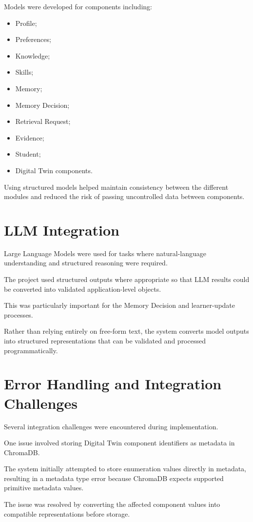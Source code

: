 \documentclass[12pt,a4paper]{article}
\begin{document}
Models were developed for components including:
\begin{itemize}[noitemsep,topsep=2pt]
    \item Profile;
    \item Preferences;
    \item Knowledge;
    \item Skills;
    \item Memory;
    \item Memory Decision;
    \item Retrieval Request;
    \item Evidence;
    \item Student;
    \item Digital Twin components.
\end{itemize}

Using structured models helped maintain consistency between the different modules and reduced the risk of passing uncontrolled data between components.

\section{LLM Integration}
Large Language Models were used for tasks where natural-language understanding and structured reasoning were required.

The project used structured outputs where appropriate so that LLM results could be converted into validated application-level objects.

This was particularly important for the Memory Decision and learner-update processes.

Rather than relying entirely on free-form text, the system converts model outputs into structured representations that can be validated and processed programmatically.

\section{Error Handling and Integration Challenges}
Several integration challenges were encountered during implementation.

One issue involved storing Digital Twin component identifiers as metadata in ChromaDB.

The system initially attempted to store enumeration values directly in metadata, resulting in a metadata type error because ChromaDB expects supported primitive metadata values.

The issue was resolved by converting the affected component values into compatible representations before storage.
\end{document}
